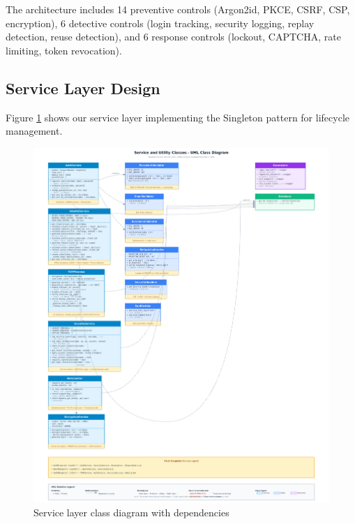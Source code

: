 \documentclass[12pt,a4paper]{article}
\begin{document}
The architecture includes 14 preventive controls (Argon2id, PKCE, CSRF, CSP, encryption), 6 detective controls (login tracking, security logging, replay detection, reuse detection), and 6 response controls (lockout, CAPTCHA, rate limiting, token revocation).

\subsection{Service Layer Design}

Figure \ref{fig:classes} shows our service layer implementing the Singleton pattern for lifecycle management.

\begin{landscape}
\begin{figure}[H]
    \centering
    \includegraphics[width=\linewidth,height=0.85\textheight,keepaspectratio]{diagrams/2_class_diagram_services.png}
    \caption{Service layer class diagram with dependencies}
    \label{fig:classes}
\end{figure}
\end{landscape}
\end{document}
